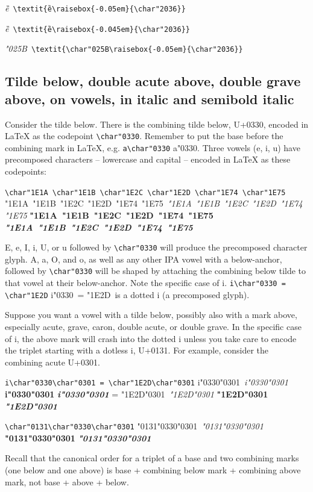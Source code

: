 \documentclass[landscape]{article}
\newcommand{\ribbiline}[1]{#1\ 
	{\itshape #1}
	{\bfseries #1}
	{\itshape\bfseries #1}}
\begin{document}
\textit{ȅ}\ \verb|\textit{ȅ\raisebox{-0.05em}{\char"2036}}|

\textit{ȅ}\ \verb|\textit{ȅ\raisebox{-0.045em}{\char"2036}}|

\textit{\char"025B}\ \verb|\textit{\char"025B\raisebox{-0.05em}{\char"2036}}|

\subsection*{Tilde below, double acute above, double grave above, on vowels, in italic and semibold italic}

Consider the tilde below. 
There is the combining tilde below, U+0330, encoded in LaTeX as the codepoint \verb|\char"0330|.
Remember to put the base before the combining mark in LaTeX, e.g. \verb|a\char"0330| a\char"0330.
Three vowels (e, i, u) have precomposed characters -- lowercase and capital -- 
encoded in LaTeX as these codepoints:

\verb|\char"1E1A \char"1E1B \char"1E2C \char"1E2D \char"1E74 \char"1E75|
\ribbiline {\char"1E1A\ \char"1E1B\ \char"1E2C\ \char"1E2D\ \char"1E74\ \char"1E75}

E, e, I, i, U, or u followed by \verb|\char"0330| will produce the precomposed character glyph.
A, a, O, and o, as well as any other IPA vowel with a below-anchor, followed by \verb|\char"0330| will be shaped 
by attaching the combining below tilde to that vowel at their below-anchor.
Note the specific case of i. 
\verb|i\char"0330 = \char"1E2D| i\char"0330\ = \char"1E2D\ is a dotted i (a precomposed glyph).

Suppose you want a vowel with a tilde below, possibly also with a mark above, 
especially acute, grave, caron, double acute, or double grave.
In the specific case of i, the above mark will crash into the dotted i 
unless you take care to encode the triplet starting with a dotless i, U+0131. 
For example, consider the combining acute U+0301.

\verb|i\char"0330\char"0301 = \char"1E2D\char"0301| \ribbiline{i\char"0330\char"0301} = \ribbiline{\char"1E2D\char"0301}

\verb|\char"0131\char"0330\char"0301| \ribbiline{\char"0131\char"0330\char"0301}

Recall that the canonical order for a triplet of a base and two combining marks (one below and one above) 
is base + combining below mark + combining above mark, not base + above + below.
\end{document}
